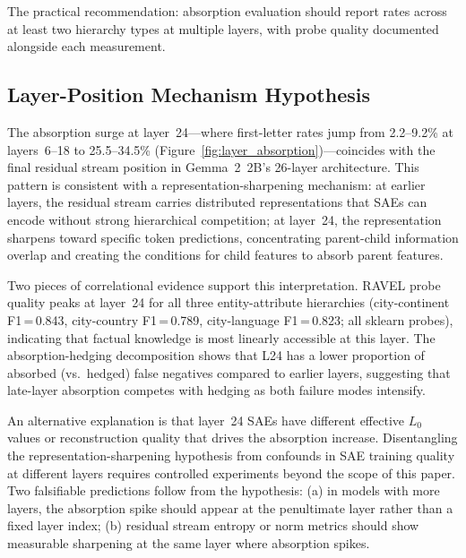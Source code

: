 \documentclass{article}
\begin{document}
The practical recommendation: absorption evaluation should report rates across at least two hierarchy types at multiple layers, with probe quality documented alongside each measurement.

\subsection{Layer-Position Mechanism Hypothesis}
\label{sec:mechanism}

The absorption surge at layer~24---where first-letter rates jump from 2.2--9.2\% at layers~6--18 to 25.5--34.5\% (Figure~\ref{fig:layer_absorption})---coincides with the final residual stream position in Gemma~2~2B's 26-layer architecture. This pattern is consistent with a representation-sharpening mechanism: at earlier layers, the residual stream carries distributed representations that SAEs can encode without strong hierarchical competition; at layer~24, the representation sharpens toward specific token predictions, concentrating parent-child information overlap and creating the conditions for child features to absorb parent features.

Two pieces of correlational evidence support this interpretation. RAVEL probe quality peaks at layer~24 for all three entity-attribute hierarchies (city-continent F1\,=\,0.843, city-country F1\,=\,0.789, city-language F1\,=\,0.823; all sklearn probes), indicating that factual knowledge is most linearly accessible at this layer. The absorption-hedging decomposition shows that L24 has a lower proportion of absorbed (vs.\ hedged) false negatives compared to earlier layers, suggesting that late-layer absorption competes with hedging as both failure modes intensify.

An alternative explanation is that layer~24 SAEs have different effective $L_0$ values or reconstruction quality that drives the absorption increase. Disentangling the representation-sharpening hypothesis from confounds in SAE training quality at different layers requires controlled experiments beyond the scope of this paper. Two falsifiable predictions follow from the hypothesis: (a) in models with more layers, the absorption spike should appear at the penultimate layer rather than a fixed layer index; (b) residual stream entropy or norm metrics should show measurable sharpening at the same layer where absorption spikes.
\end{document}
